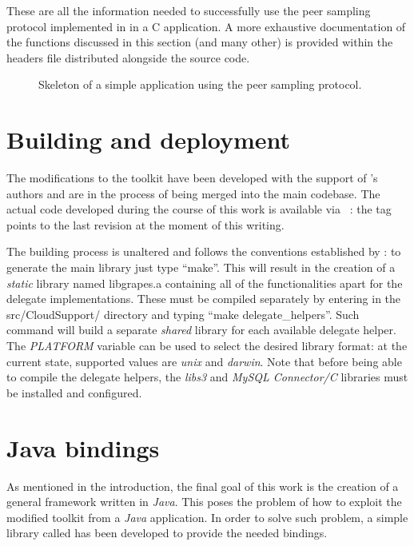 These are all the information needed to successfully use the
\cloudcast peer sampling protocol implemented in \grapes in a C
application. A more exhaustive documentation of the functions discussed
in this section (and many other) is provided within the headers file
distributed alongside the source code.

\begin{figure}[H]
  \centering
  
  \caption{Skeleton of a simple application using the \cloudcast
    peer sampling protocol.}
  \label{lst:grapes-example-app}
\end{figure}

\section{Building and deployment}
The modifications to the toolkit have been developed with the
support of \grapes's authors and are in the process of being merged
into the main codebase. The actual code developed during the course of
this work is available via \github~\cite{GRAPES-repo}: the tag
\thesistag points to the last revision at the moment of this
writing.

The building process is unaltered and follows the conventions
established by \grapes: to generate the main library just type ``make''. This
will result in the creation of a \emph{static} library named
\textsf{libgrapes.a} containing all of the functionalities apart
for the \cloudhelper delegate implementations. These must be compiled
separately by entering in the \textsf{src/CloudSupport/} directory and
typing ``make delegate\_helpers''. Such command will build a
separate \textit{shared} library for each available delegate
helper. The \textit{PLATFORM} variable can be used to select the
desired library format: at the current state, supported values are
\textit{unix} and \textit{darwin}.
Note that before being able to compile the delegate helpers, the
\emph{libs3} and \emph{MySQL Connector/C} libraries must be
installed and configured.

\section{Java bindings}
As mentioned in the introduction, the final goal of this work is
the creation of a general framework written in \emph{Java}. This poses
the problem of how to exploit the modified \grapes toolkit from a
\emph{Java} application. In order to solve such problem, a simple
library called \jgrapes has been developed to provide the needed
bindings.

